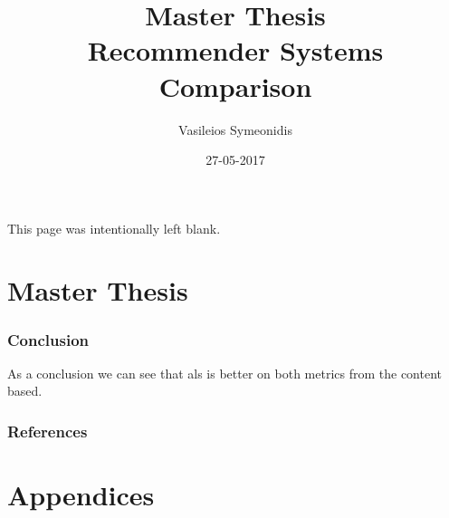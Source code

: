 \documentclass{article}
\title{Master Thesis \\ Recommender Systems Comparison}
\date{27-05-2017}
\author{Vasileios Symeonidis}
\begin{document}

\maketitle
{}
\newpage
\tableofcontents
{}
\newpage
{}
\begin{center}
This page was intentionally left blank.
\end{center}
\newpage
{}

\part{Master Thesis}





\section{Conclusion}
As a conclusion we can see that als is better on both metrics from the content based.

\newpage
\section{References}



\newpage
\appendix
\part{Appendices}








%	
%	
\end{document}
